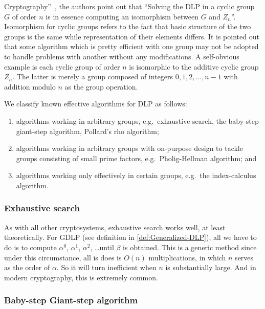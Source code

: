 \documentclass[12pt,journal,compsoc]{IEEEtran}
\begin{document}
Cryptography''~\cite{ref:menezes2010handbook}, the authors point out
that ``Solving the DLP in a cyclic group $G$ of order $n$ is in
essence computing an isomorphism between $G$ and
$Z_{n}$''. Isomorphism for cyclic groups refers to the fact that basic
structure of the two groups is the same while representation of their
elements differs. It is pointed out that some algorithm which is
pretty efficient with one group may not be adopted to handle problems
with another without any modifications. A self-obvious example is each
cyclic group of order $n$ is isomorphic to the additive cyclic group
$Z_{n}$. The latter is merely a group composed of integers
${0,1,2,\ldots,n-1}$ with addition modulo $n$ as the group operation.
\par
We classify known effective algorithms for DLP as follows:
\begin{enumerate}
\item algorithms working in arbitrary groups, e.g.\ exhaustive search,
  the baby-step-giant-step algorithm, Pollard's rho algorithm;
\item algorithms working in arbitrary groups with on-purpose design to
  tackle groups consisting of small prime factors, e.g.\
  Pholig-Hellman algorithm; and
\item algorithms working only effectively in certain groups, e.g.\ the
  index-calculus algorithm.
\end{enumerate}



\subsubsection{\qquad Exhaustive search}
\label{sec:exhaustive-search}
As with all other cryptosystems, exhaustive search works well, at
least theoretically. For GDLP (see definition in
\ref{def:Generalized-DLP}), all we have to do is to compute 
$\alpha^{0}$, $\alpha^{1}$, $\alpha^{2}$, \ldots until $\beta$ is
obtained. This is a generic method since under this circumstance, all
is does is $O(n)$ multiplications, in which $n$ serves as the order of
$\alpha$. So it will turn inefficient when $n$ is substantially
large. And in modern cryptography, this is extremely common.

\subsubsection{\qquad Baby-step Giant-step algorithm}
\label{sec:baby-step-giant}
\end{document}
